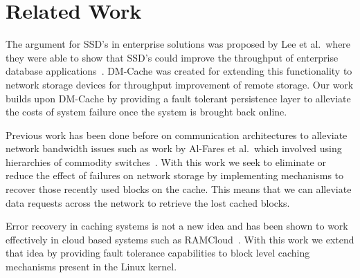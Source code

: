 \section{Related Work}
\label{sec:related}

The argument for SSD's in enterprise solutions was proposed by Lee et
al.\ where they were able to show that SSD's could improve the
throughput of enterprise database
applications~\cite{EnterpriseSSD}. DM-Cache was created for extending
this functionality to network storage devices for throughput
improvement of remote storage. Our work builds upon DM-Cache by
providing a fault tolerant persistence layer to alleviate the costs of
system failure once the system is brought back online.

Previous work has been done before on communication architectures to
alleviate network bandwidth issues such as work by Al-Fares et al.\
which involved using hierarchies of commodity
switches~\cite{Network}. With this work we seek to eliminate or reduce
the effect of failures on network storage by implementing mechanisms
to recover those recently used blocks on the cache. This means that we
can alleviate data requests across the network to retrieve the lost
cached blocks.

Error recovery in caching systems is not a new idea and has been shown
to work effectively in cloud based systems such as
RAMCloud~\cite{RAMCloud}. With this work we extend that idea by
providing fault tolerance capabilities to block level caching
mechanisms present in the Linux kernel.
